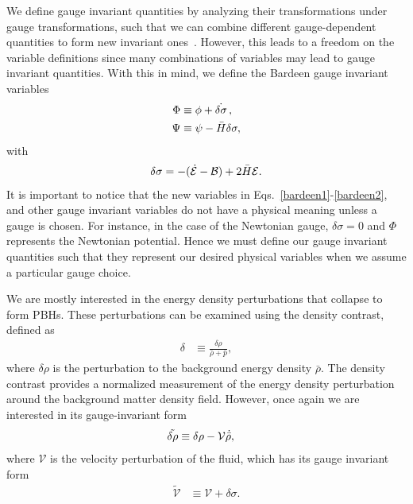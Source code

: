 \documentclass[a4paper,11pt]{article}
\begin{document}
We define gauge invariant quantities by analyzing their transformations under gauge
transformations, such that we can combine different gauge-dependent quantities to form
new invariant ones~\cite{covariant_bardeen}. However, this leads to a freedom on the
variable definitions since many combinations of variables may lead to gauge invariant
quantities. With this in mind, we define the Bardeen gauge invariant
variables~\cite{Bardeen1980}
\begin{align}
	\label{bardeen1}
	\Phi & \equiv \phi + \dot{\delta \sigma}\, , \\
	\label{bardeen2}
	\Psi & \equiv \psi - \Bar{H}\delta \sigma
	,\end{align}
with
\begin{align}
	\delta\sigma = -(\dot{\mathcal{E}} - \mathcal{B}) + {2 \Bar{H}\mathcal{E}}
	.\end{align}
It is important to notice that the new variables in
Eqs.~\eqref{bardeen1}-\eqref{bardeen2}, and other gauge invariant variables do not have
a physical meaning unless a gauge is chosen. For instance, in the case of the Newtonian
gauge, $\delta\sigma = 0$ and $\Phi$ represents the Newtonian potential. Hence we must
define our gauge invariant quantities such that they represent our desired physical
variables when we assume a particular gauge choice.

We are mostly interested in the energy density perturbations that collapse to form PBHs.
These perturbations can be examined using the density contrast, defined as
\begin{align}
	\label{densitycon}
	\delta & \equiv \frac{\delta \rho}{\bar{\rho} + \bar{p}}
	,\end{align}
where $\delta\rho$ is the perturbation to the background energy density $\bar\rho$. The
density contrast provides a normalized measurement of the energy density perturbation
around the background matter density field. However, once again we are interested in its
gauge-invariant form
\begin{align}
	\label{deltarhoinvariant}
	\tilde{\delta\rho} & \equiv \delta\rho - \mathcal{V} \dot{\Bar{\rho}}
	,\end{align}
where $\mathcal{V}$ is the velocity perturbation of the fluid, which has its gauge
invariant form
\begin{align}
	\tilde{\mathcal{V}} & \equiv \mathcal{V} + \delta\sigma
	.\end{align}
\end{document}
